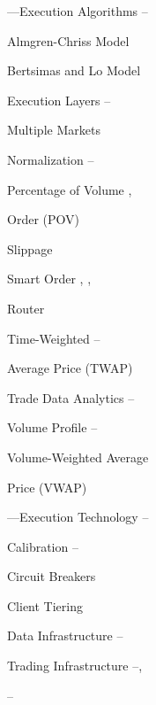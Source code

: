 \begin{multicols}{2}
\noindent ---Execution Algorithms \hfill \pageref{in:exec_alg1}--\pageref{in:exec_alg2} \par
\twoindent Almgren-Chriss Model \hfill \pageref{in:alm_chriss} \par
\twoindent Bertsimas and Lo Model \hfill \pageref{in:bert_lo} \par
\twoindent Execution Layers \hfill \pageref{in:exec_layer1}--\pageref{in:exec_layer2} \par
\twoindent Multiple Markets \hfill  \pageref{in:mult_mark} \par 
\twoindent Normalization \hfill \pageref{in:normalization1}--\pageref{in:normalization2} \par
\twoindent Percentage of Volume \hfill \pageref{in:pov1}, \pageref{in:pov2} \par \hspace{0.75cm} Order (POV) \par 
\twoindent Slippage \hfill \pageref{in:slippage} \par
\twoindent Smart Order \hfill \pageref{in:sor1}, \pageref{in:sor2}, \pageref{in:sor3} \par \hspace{0.75cm} Router \par
\twoindent Time-Weighted \hfill \pageref{in:twap1}--\pageref{in:twap2} \par
\hspace{0.75cm} Average Price (TWAP) \par
\twoindent Trade Data Analytics \hfill \pageref{in:tda1}--\pageref{in:tda2} \par
\twoindent Volume Profile \hfill \pageref{in:vol_prof1}--\pageref{in:vol_prof2} \par
\twoindent Volume-Weighted Average \hfill \pageref{in:vwap} \par \hspace{0.75cm} Price (VWAP)
\vspace{\baselineskip}


\noindent ---Execution Technology \hfill \pageref{in:exec_tech1}--\pageref{in:exec_tech2} \par
\twoindent Calibration \hfill \pageref{in:calb1}--\pageref{in:calb2} \par
\twoindent Circuit Breakers \hfill \pageref{in:circ_br} \par
\twoindent Client Tiering \hfill \pageref{in:client_t1} \par %
\twoindent Data Infrastructure \hfill \pageref{in:dat_infr1}--\pageref{in:dat_infr2} \par
\twoindent Trading Infrastructure \hfill \pageref{in:trad_infr1}--\pageref{in:trad_infr2}, \par \hfill \pageref{in:trad_infr3}--\pageref{in:trad_infr4}\, \par
\vspace{\baselineskip}



\end{multicols}
